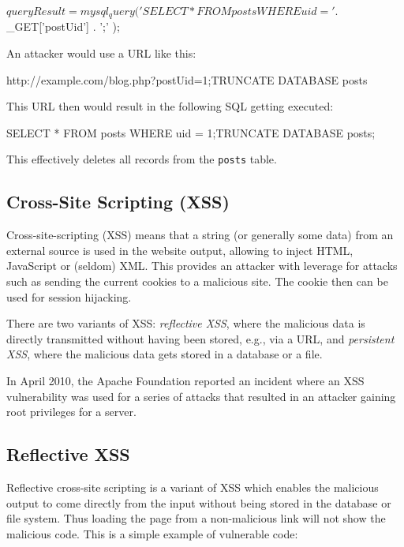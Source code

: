\begin{phpcode}
$queryResult = mysql_query(
  'SELECT * FROM posts WHERE uid = ' . $_GET['postUid'] . ';'
);
\end{phpcode}

An attacker would use a URL like this:

\begin{textcode}
http://example.com/blog.php?postUid=1;TRUNCATE DATABASE posts
\end{textcode}

This URL then would result in the following SQL getting executed:

\begin{sqlcode}
SELECT * FROM posts WHERE uid = 1;TRUNCATE DATABASE posts;
\end{sqlcode}

This effectively deletes all records from the \texttt{posts} table.


\subsection{Cross-Site Scripting (XSS)}
\label{xss}
Cross-site-scripting (XSS) means that a string (or generally some data) from an external source is used in the website output, allowing to inject HTML, JavaScript or (seldom) XML. This provides an attacker with leverage for attacks such as sending the current cookies to a malicious site. The cookie then can be used for session hijacking.

There are two variants of XSS: \emph{reflective XSS}, where the malicious data is directly transmitted without having been stored, e.g., via a URL, and \emph{persistent XSS}, where the malicious data gets stored in a database or a file.

In April 2010, the Apache Foundation reported an incident where an XSS vulnerability was used for a series of attacks that resulted in an attacker gaining root privileges for a server. \cite{apache-incident-report}


\subsection{Reflective XSS}
Reflective cross-site scripting is a variant of XSS which enables the malicious output to come directly from the input without being stored in the database or file system. Thus loading the page from a non-malicious link will not show the malicious code. This is a simple example of vulnerable code:

